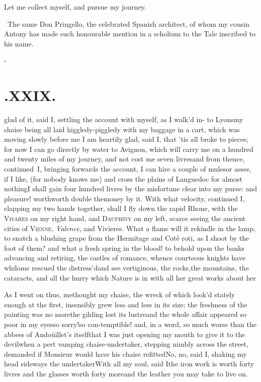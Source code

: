 \documentclass{article}
\begin{document}
\tsh Let me collect myself, and pursue my journey.

\bigskip
\bgroup\footnotesize
\indent\fnast\ The same Don Pringello, the
celebrated Spa\-nish architect, of whom my cousin Antony has\break
made such honourable mention in a scholium to\break
the Tale inscribed to his name.\\\par
\egroup

\vfill{}\eject
\null\kern-\baselineskip
\section{.\enspace XXIX.}

 glad of it, said I, settling the account with myself, as I
walk’d in-\break
to Lyons\tsh my chaise being all laid higgledy-piggledy
with my baggage in a cart, which was moving slowly before me\tsh
I am heartily glad, said I, that ’tis all broke to pieces; for
now I can go directly by water to Avignon, which will carry me
on a hundred and twenty miles of my journey, and not cost me
seven livres\tsh and from thence, continued~I, bringing forwards
the account, I can hire a couple of mules\tsk or asses, if I
like, (for nobody knows me) and cross the plains of Languedoc
for almost nothing\tsh I shall gain four hundred livres by the
misfortune clear into my purse: and pleasure! worth\tsk worth
double the\break money by it. With what velocity, continued I,
clapping my two hands toge\-ther, shall I fly down the rapid
Rhone, with the \textsc{Vivares} on my right hand, and
\textsc{Dauphiny} on my left, scarce seeing the ancient cities
of \textsc{Vienne}, \textit{Valence}, and Vivieres. What a flame
will it rekindle in the lamp, to snatch a blushing grape from
the Hermitage and Cotê roti, as I shoot by the foot of them? and
what a fresh spring in the blood!  to behold upon the banks
advancing and retiring, the castles of romance, whence courteous
knights have whilome rescued the distress’d\tsh and see
vertiginous, the rocks,\break the mountains, the cataracts, and all
the hurry which Nature is in with all her great works about
her\tsh{}

As I went on thus, methought my chaise, the wreck of which look’d stately
enough at the first, insensibly grew less and less in its size; the freshness
of the painting was no more\tsk the gilding lost its lustre\tsk and the
whole affair appeared so poor in my eyes\tsk so sorry!\tsk so
con-\break temptible!
and, in a word, so much worse than the abbess of Andoüillet’s
itself\tsk that I was just opening my mouth to give it to the
devil\tsk when a pert vamping chaise-undertaker, stepping nimbly across the
street, demanded if Monsieur would have his chaise refitted\tsk No,
no, said I, shaking my head sideways\tsk{}
the undertaker\tsk With all my soul, said\break
I\tsk the iron work is worth forty livres\tsk\break
and the glasses worth forty more\tsk and the leather
you may take to live on.
\end{document}
